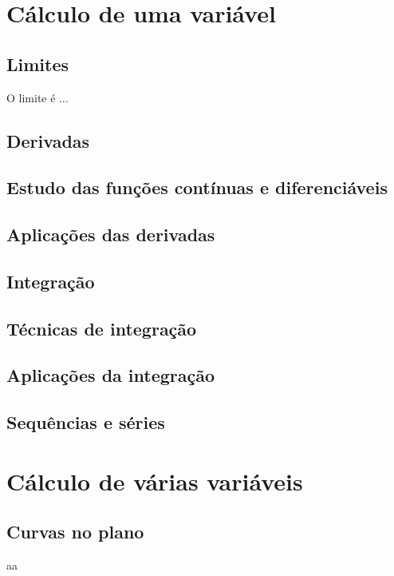 \documentclass[a4paper]{book}
\begin{document}
\part{Cálculo de uma variável}

\chapter{Limites}
O limite é ... 
\chapter{Derivadas}

\chapter{Estudo das funções contínuas e diferenciáveis}

\chapter{Aplicações das derivadas}

\chapter{Integração}

\chapter{Técnicas de integração}

\chapter{Aplicações da integração}

\chapter{Sequências e séries} 


\part{Cálculo de várias variáveis}

\chapter{Curvas no plano}
aa
\end{document}
